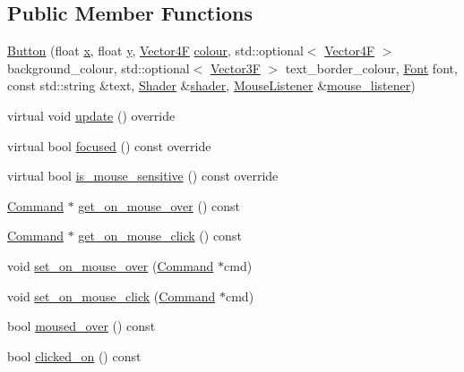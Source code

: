 \subsection*{Public Member Functions}
\begin{DoxyCompactItemize}
\item 
\mbox{\hyperlink{class_button_a228b18e1d494f3d443d9a42ad16d5568}{Button}} (float \mbox{\hyperlink{class_g_u_i_a7fa193a8ffb27bbb3bcc225e36f6d54d}{x}}, float \mbox{\hyperlink{class_g_u_i_a98f204f99ffc5ff6cffc9340bbb8c29b}{y}}, \mbox{\hyperlink{class_vector4}{Vector4F}} \mbox{\hyperlink{class_panel_a7c38e08ad80eb9972428450fb639bf66}{colour}}, std\+::optional$<$ \mbox{\hyperlink{class_vector4}{Vector4F}} $>$ background\+\_\+colour, std\+::optional$<$ \mbox{\hyperlink{class_vector3}{Vector3F}} $>$ text\+\_\+border\+\_\+colour, \mbox{\hyperlink{class_font}{Font}} font, const std\+::string \&text, \mbox{\hyperlink{class_shader}{Shader}} \&\mbox{\hyperlink{class_g_u_i_a64b007b31d0ec8a8704f9ab3bb2a7d3d}{shader}}, \mbox{\hyperlink{class_mouse_listener}{Mouse\+Listener}} \&\mbox{\hyperlink{class_button_aab6aafaa6740925acb9c69c62f68aa7e}{mouse\+\_\+listener}})
\item 
virtual void \mbox{\hyperlink{class_button_abda97f1ae8e081da3dbd0b77a27cad9d}{update}} () override
\item 
virtual bool \mbox{\hyperlink{class_button_a2c1b0adeb2920b394fe4f38354ae6604}{focused}} () const override
\item 
virtual bool \mbox{\hyperlink{class_button_aa2b16ae30fe74f215aa79c699bbf8510}{is\+\_\+mouse\+\_\+sensitive}} () const override
\item 
\mbox{\hyperlink{class_command}{Command}} $\ast$ \mbox{\hyperlink{class_button_a3f9b964049bde58b8f39170ce8b6fa2e}{get\+\_\+on\+\_\+mouse\+\_\+over}} () const
\item 
\mbox{\hyperlink{class_command}{Command}} $\ast$ \mbox{\hyperlink{class_button_ac2a5c2151dc48940ac2e9c5f07c8dd6a}{get\+\_\+on\+\_\+mouse\+\_\+click}} () const
\item 
void \mbox{\hyperlink{class_button_a6133f9b42ae1192df54babd19dec9b80}{set\+\_\+on\+\_\+mouse\+\_\+over}} (\mbox{\hyperlink{class_command}{Command}} $\ast$cmd)
\item 
void \mbox{\hyperlink{class_button_a7b60123b8609254c811e3c3cc9d50d07}{set\+\_\+on\+\_\+mouse\+\_\+click}} (\mbox{\hyperlink{class_command}{Command}} $\ast$cmd)
\item 
bool \mbox{\hyperlink{class_button_a683998d86b16a7bf4196f3f59b134f95}{moused\+\_\+over}} () const
\item 
bool \mbox{\hyperlink{class_button_a650782c10937ce67bb99aed737cd4ba1}{clicked\+\_\+on}} () const
\end{DoxyCompactItemize}
